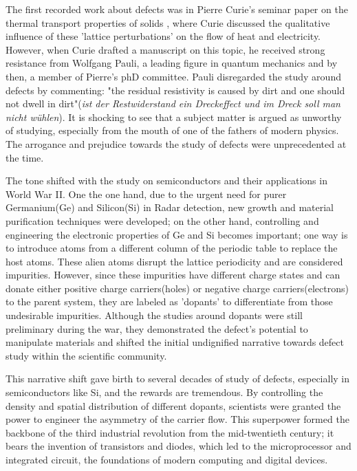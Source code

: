 The first recorded work about defects was in Pierre Curie's seminar paper on the thermal transport properties of solids \cite{ZurKinetischenTheorie}, where Curie discussed the qualitative influence of these 'lattice perturbations' on the flow of heat and electricity. However, when Curie drafted a manuscript on this topic, he received strong resistance from Wolfgang Pauli, a leading figure in quantum mechanics and by then, a member of Pierre's phD committee. Pauli disregarded the study around defects by commenting: "the residual resistivity is caused by dirt and one should not dwell in dirt"(\textit{ist der Restwiderstand ein Dreckeffect und im Dreck soll man nicht wühlen}). It is shocking to see that a subject matter is argued as unworthy of studying, especially from the mouth of one of the fathers of modern physics. The arrogance and prejudice towards the study of defects were unprecedented at the time.

The tone shifted with the study on semiconductors and their applications in World War II. One the one hand, due to the urgent need for purer Germanium(Ge) and Silicon(Si) in Radar detection, new growth and material purification techniques were developed; on the other hand, controlling and engineering the electronic properties of Ge and Si becomes important; one way is to introduce atoms from a different column of the periodic table to replace the host atoms. These alien atoms disrupt the lattice periodicity and are considered impurities. However, since these impurities have different charge states and can donate either positive charge carriers(holes) or negative charge carriers(electrons) to the parent system, they are labeled as 'dopants' to differentiate from those undesirable impurities. Although the studies around dopants were still preliminary during the war, they demonstrated the defect's potential to manipulate materials and shifted the initial undignified narrative towards defect study within the scientific community.

This narrative shift gave birth to several decades of study of defects, especially in semiconductors like Si, and the rewards are tremendous. By controlling the density and spatial distribution of different dopants, scientists were granted the power to engineer the asymmetry of the carrier flow. This superpower formed the backbone of the third industrial revolution from the mid-twentieth century; it bears the invention of transistors and diodes, which led to the microprocessor and integrated circuit, the foundations of modern computing and digital devices.   

